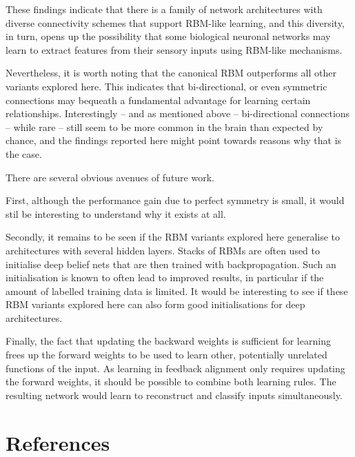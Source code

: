 \documentclass[11pt]{article}
\begin{document}
These findings indicate that there is a family of network
architectures with diverse connectivity schemes that support RBM-like
learning, and this diversity, in turn, opens up the possibility that
some biological neuronal networks may learn to extract features from
their sensory inputs using RBM-like mechanisms.

Nevertheless, it is worth noting that the canonical RBM outperforms
all other variants explored here. This indicates that bi-directional,
or even symmetric connections may bequeath a fundamental advantage for
learning certain relationships. Interestingly -- and as mentioned
above -- bi-directional connections -- while rare -- still seem to be
more common in the brain than expected by chance, and the findings
reported here might point towards reasons why that is the case.

There are several obvious avenues of future work.

First, although the performance gain due to perfect symmetry is small,
it would stil be interesting to understand why it exists at all.

Secondly, it remains to be seen if the RBM variants explored here
generalise to architectures with several hidden layers. Stacks of RBMs
are often used to initialise deep belief nets that are then trained
with backpropagation. Such an initialisation is known to often lead to
improved results, in particular if the amount of labelled training
data is limited. It would be interesting to see if these RBM variants
explored here can also form good initialisations for deep
architectures.

Finally, the fact that updating the backward weights is sufficient for
learning frees up the forward weights to be used to learn other,
potentially unrelated functions of the input. As learning in feedback
alignment only requires updating the forward weights, it should be
possible to combine both learning rules. The resulting network would
learn to reconstruct and classify inputs simultaneously.

\section{References}


\end{document}

